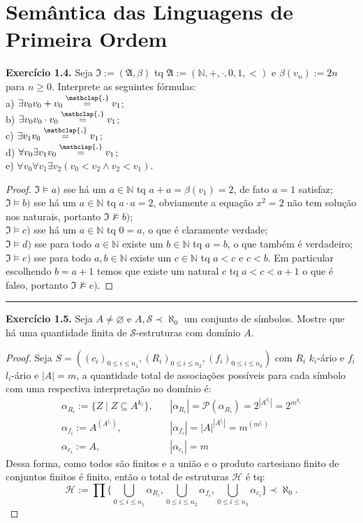 \documentclass[11pt]{article}
\theoremstyle{definition}
\newcommand{\mc}[1]{\mathcal{#1}}
\newcommand{\mf}[1]{\mathfrak{#1}}
\newcommand{\mbb}[1]{\mathbb{#1}}
\newcommand\overtext[2]{\stackrel{\mathclap{\normalfont\mbox{#1}}}{#2}}
\begin{document}
\section{Semântica das Linguagens de Primeira Ordem}

\textbf{Exercício 1.4.} Seja $\mf{I}:=(\mf{A},\beta)$ tq $\mf{A}:=(\mbb{N},+,\cdot,0,1,<)$ e $\beta(v_n):=2n$ para $n\ge0$. Interprete as seguintes fórmulas:\\
a) $\exists v_0v_0+v_0\overtext{.}{=} v_1$;\\
b) $\exists v_0v_0\cdot v_0\overtext{.}{=} v_1$;\\
c) $\exists v_1v_0\overtext{.}{=} v_1$;\\
d) $\forall v_0\exists v_1v_0\overtext{.}{=} v_1$;\\
e) $\forall v_0\forall v_1\exists v_2(v_0<v_2\wedge v_2<v_1)$.

\begin{proof}
    $\mf{I}\vDash a)$ sse há um $a\in\mbb{N}$ tq $a+a=\beta(v_1)=2$, de fato $a=1$ satisfaz;\\
    $\mf{I}\vDash b)$ sse há um $a\in\mbb{N}$ tq $a\cdot a=2$, obviamente a equação $x^2=2$ não tem solução nos naturais, portanto $\mf{I}\nvDash b)$;\\
    $\mf{I}\vDash c)$ sse há um $a\in\mbb{N}$ tq $0=a$, o que é claramente verdade;\\
    $\mf{I}\vDash d)$ sse para todo $a\in\mbb{N}$ existe um $b\in\mbb{N}$ tq $a = b$, o que também é verdadeiro;\\
    $\mf{I}\vDash e)$ sse para todo $a,b\in\mbb{N}$ existe um $c\in\mbb{N}$ tq $a<c$ e $c<b$. Em particular escolhendo $b = a+1$ temos que existe um natural $c$ tq $a < c < a+1$ o que é falso, portanto $\mf{I}\nvDash e)$.
\end{proof}

\hrule

\textbf{Exercício 1.5.} Seja $A\ne\varnothing$ e $A,\mc{S}\prec\aleph_0$ um conjunto de símbolos. Mostre que há uma quantidade finita de $\mc{S}$-estruturas com domínio $A$.

\begin{proof}
Seja $S=((c_i)_{0\le i\le n_1},(R_i)_{0\le i\le n_2},(f_i)_{0\le i\le n_3})$ com $R_i$ $k_i$-ário e $f_i$ $l_i$-ário e $|A|=m$, a quantidade total de associações possíveis para cada símbolo com uma respectiva interpretação no domínio é:
\begin{align*}
    \alpha_{R_i} :=\{Z\mid Z\subseteq A^{k_i}\}, & ~~~~|\alpha_{R_i}| =\mc{P}(\alpha_{R_i}) = 2^{|A^{k_i}|}=2^{m^{k_i}}\\
    \alpha_{f_i} :=A^{\left(A^{l_i}\right)}, & ~~~~|\alpha_{f_i}| = |A|^{|A^{l_i}|} = m^{\left(m^{l_i}\right)}\\
    \alpha_{c_i} := A, & ~~~~|\alpha_{c_i}| = m
\end{align*}
Dessa forma, como todos são finitos e a união e o produto cartesiano finito de conjuntos finitos é finito, então o total de estruturas $\mc{H}$ é tq:
\[
\mc{H}:=\prod\Biggl\{\bigcup_{0\le i\le n_1}\alpha_{R_i},\bigcup_{0\le i\le n_2}\alpha_{f_i},\bigcup_{0\le i\le n_3}\alpha_{c_i}\Biggr\}\prec\aleph_0.
\]
\end{proof}
\end{document}
